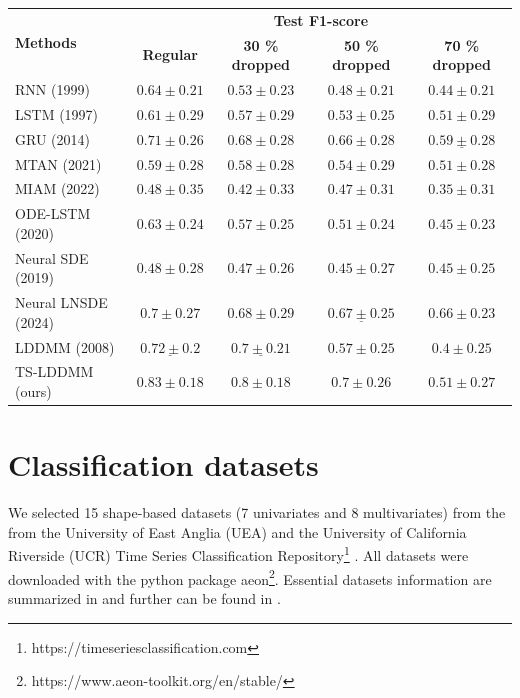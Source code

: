 \begin{table}[hbt!]
  \centering
  \begin{tabular}{lcccc}
    \toprule
    \multirow[c]{2}{*}{\textbf{Methods}} & \multicolumn{4}{c}{\textbf{Test F1-score}} \\
    \cline{2-5}
     &  \textbf{Regular} & \textbf{30 \% dropped} &  \textbf{50 \% dropped} & \textbf{70 \% dropped} \\
    \midrule
    RNN (1999) & $0.64 \pm 0.21$ & $0.53 \pm 0.23$ & $0.48 \pm 0.21$ & $0.44 \pm 0.21$ \\
    LSTM (1997) & $0.61 \pm 0.29$ & $0.57 \pm 0.29$ & $0.53 \pm 0.25$ & $0.51 \pm 0.29$ \\
    GRU (2014) & $0.71 \pm 0.26$ & $0.68 \pm 0.28$ & $0.66 \pm 0.28$ & $\underline{0.59 \pm 0.28}$ \\
    MTAN (2021) & $0.59 \pm 0.28$ & $0.58 \pm 0.28$ & $0.54 \pm 0.29$ & $0.51 \pm 0.28$ \\
    MIAM (2022) & $0.48 \pm 0.35$ & $0.42 \pm 0.33$ & $0.47 \pm 0.31$ & $0.35 \pm 0.31$ \\
    ODE-LSTM (2020) & $0.63 \pm 0.24$ & $0.57 \pm 0.25$ & $0.51 \pm 0.24$ & $0.45 \pm 0.23$ \\
    Neural SDE (2019) & $0.48 \pm 0.28$ & $0.47 \pm 0.26$ & $0.45 \pm 0.27$ & $0.45 \pm 0.25$ \\
    Neural LNSDE (2024) & $0.7 \pm 0.27$ & $0.68 \pm 0.29$ & $\underline{0.67 \pm 0.25}$ & $\mathbf{0.66 \pm 0.23}$ \\
    LDDMM (2008) & $\underline{0.72 \pm 0.2}$ & $\underline{0.7 \pm 0.21}$ & $0.57 \pm 0.25$ & $0.4 \pm 0.25$ \\
    TS-LDDMM (ours) & $\mathbf{0.83 \pm 0.18}$ & $\mathbf{0.8 \pm 0.18}$ & $\mathbf{0.7 \pm 0.26}$ & $0.51 \pm 0.27$ \\
    \bottomrule
  \end{tabular}  
\end{table}

\section{Classification datasets}
\label{appendix:classification_dataset}
We selected 15 shape-based datasets (7 univariates and 8 multivariates) from the from the University of East Anglia (UEA) and the University of California Riverside (UCR) Time Series Classification Repository\footnote{https://timeseriesclassification.com} \cite{dau2019ucr,bagnall2018uea}. All datasets were downloaded with the python package aeon\footnote{https://www.aeon-toolkit.org/en/stable/}. Essential datasets information are summarized in  and further can be found in \cite{dau2019ucr,bagnall2018uea}.

